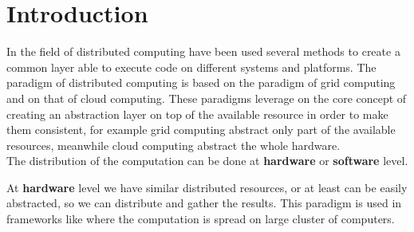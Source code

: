 \cleardoublepage
\chapter{Introduction}
\label{intro}



In the field of distributed computing have been used several methods to create a
common layer able to execute code on different systems and platforms. The paradigm
of distributed computing is based on the paradigm of grid computing and on that of
cloud computing. These paradigms leverage on the core concept of creating an abstraction
layer on top of the available resource in order to make them consistent, for example
grid computing abstract only part of the available resources, meanwhile cloud
computing abstract the whole hardware.\\

The distribution of the computation can be done at \textbf{hardware} or 
\textbf{software} level.

At \textbf{hardware} level we have similar distributed resources, or at least
can be easily abstracted, so we can distribute and gather the results. This
paradigm is used in frameworks like \cite{dean2008mapreduce} where the
computation is spread on large cluster of computers.

